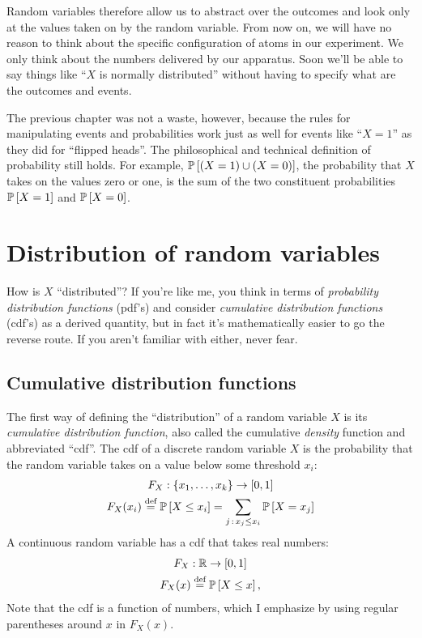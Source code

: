 Random variables therefore allow us to abstract over the outcomes and look
only at the values taken on by the random variable. From now on, we will have
no reason to think about the specific configuration of atoms in our
experiment. We only think about the numbers delivered by our apparatus. Soon
we'll be able to say things like ``$X$ is normally distributed'' without having
to specify what are the outcomes and events.

The previous chapter was not a waste, however, because the
rules for manipulating events and probabilities work just as well for
events like ``$X = 1$'' as they did for ``flipped heads''. The philosophical and
technical definition of probability still holds. For example, $\mathbb{P}\left[{(X = 1)
\cup (X = 0)}\right]$, the probability that $X$ takes on the values zero or one, is the
sum of the two constituent probabilities $\mathbb{P}\left[{X=1}\right]$ and
$\mathbb{P}\left[{X=0}\right]$.

\section{Distribution of random variables}

How is $X$ ``distributed''? If you're like me, you think in terms of
\emph{probability distribution functions} (pdf's) and consider
\emph{cumulative distribution functions} (cdf's) as a derived quantity, but in
fact it's mathematically easier to go the reverse route. If you aren't
familiar with either, never fear.

\subsection{Cumulative distribution functions}

The first way of defining the ``distribution'' of a random variable $X$ is its
\emph{cumulative distribution function}, also called the cumulative
\emph{density} function and abbreviated ``cdf''. The cdf of a discrete random
variable $X$ is the probability that the random variable takes on a value
below some threshold $x_i$:
\begin{gather*}
F_X : \{x_1, \ldots, x_k\} \to [0, 1] \\
F_X(x_i) \stackrel{\text{def}}{=} \mathbb{P}\left[{X \leq x_i}\right] = \sum_{j \,:\, x_j \leq x_i} \mathbb{P}\left[{X = x_j}\right]
\end{gather*}
A continuous random variable has a cdf that takes real numbers:
\begin{gather*}
F_X : \mathbb{R} \to [0, 1] \\
F_X(x) \stackrel{\text{def}}{=} \mathbb{P}\left[{X \leq x}\right],
\end{gather*}
Note that the cdf is a function of numbers, which I emphasize by
using regular parentheses around $x$ in $F_X(x)$.

